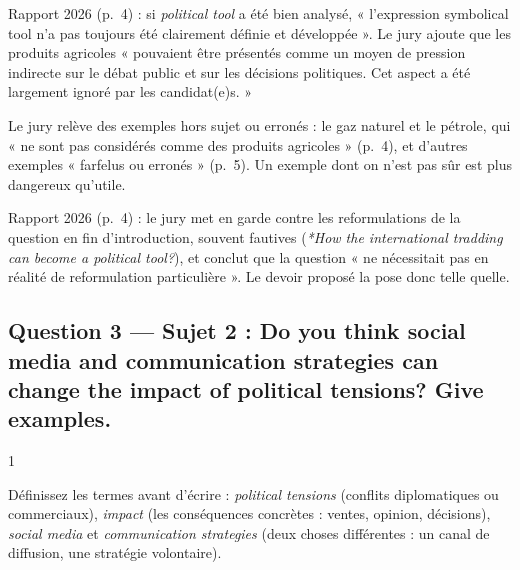\documentclass[11pt,a4paper]{article}
\begin{document}
\begin{jury}

Rapport 2026 (p.~4) : si \emph{political tool} a été bien analysé, « l'expression symbolical tool n'a pas toujours été clairement définie et développée ». Le jury ajoute que les produits agricoles « pouvaient être présentés comme un moyen de pression indirecte sur le débat public et sur les décisions politiques. Cet aspect a été largement ignoré par les candidat(e)s. »

\end{jury}

\begin{piege}

Le jury relève des exemples hors sujet ou erronés : le gaz naturel et le pétrole, qui « ne sont pas considérés comme des produits agricoles » (p.~4), et d'autres exemples « farfelus ou erronés » (p.~5). Un exemple dont on n'est pas sûr est plus dangereux qu'utile.

\end{piege}

\begin{jury}

Rapport 2026 (p.~4) : le jury met en garde contre les reformulations de la question en fin d'introduction, souvent fautives (\emph{*How the international tradding can become a political tool?}), et conclut que la question « ne nécessitait pas en réalité de reformulation particulière ». Le devoir proposé la pose donc telle quelle.

\end{jury}

\hypertarget{question-3-sujet-2-do-you-think-social-media-and-communication-strategies-can-change-the-impact-of-political-tensions-give-examples.}{%
\subsection{Question 3 --- Sujet 2 : Do you think social media and communication strategies can change the impact of political tensions? Give examples.}\label{question-3-sujet-2-do-you-think-social-media-and-communication-strategies-can-change-the-impact-of-political-tensions-give-examples.}}

\begin{indication}{1}

Définissez les termes avant d'écrire : \emph{political tensions} (conflits diplomatiques ou commerciaux), \emph{impact} (les conséquences concrètes : ventes, opinion, décisions), \emph{social media} et \emph{communication strategies} (deux choses différentes : un canal de diffusion, une stratégie volontaire).

\end{indication}
\end{document}
